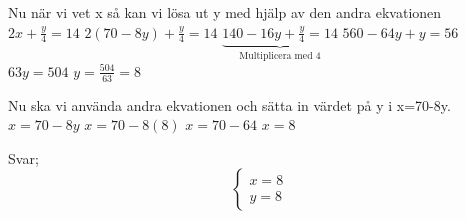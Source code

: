\documentclass[a4paper,10pt]{article}
\begin{document}
\begin{flushleft}
Nu när vi vet x så kan vi lösa ut y med hjälp av den andra ekvationen
$2x+\frac{y}{4}=14$\newline
$2(70-8y)+\frac{y}{4}=14$\newline
$\underbrace{140-16y+\frac{y}{4}=14}_{\text{Multiplicera med 4}}$\newline
$560-64y+y=56$\newline
$63y=504$\newline
$y=\frac{504}{63}=8$

Nu ska vi använda andra ekvationen och sätta in värdet på y i x=70-8y.
$x=70-8y$\newline
$x=70-8(8)$\newline
$x=70-64$\newline
$x=8$


Svar;
\[
\begin{cases}
x = 8\\
y = 8
\end{cases}
\]

\end{flushleft}
\end{document}
